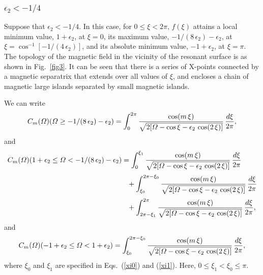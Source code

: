 \documentclass[12pt,prb,aps]{revtex4-1}
\begin{document}
\subsubsection{$\epsilon_2<-1/4$}
Suppose that $\epsilon_2<- 1/4$. In this case, for $0\leq \xi< 2\pi$, $f(\xi)$ attains a local minimum value, $1+\epsilon_2$, at $\xi=0$, its  maximum value, $-1/(8\,\epsilon_2)-\epsilon_2$, at $\xi=\cos^{-1}[-1/(4\,\epsilon_2)]$,
and its absolute minimum value, $-1+\epsilon_2$, at $\xi=\pi$.    The topology of the magnetic field 
in the vicinity of the resonant surface is as shown in Fig.~\ref{fig3}. It can be seen that there is  a series of X-points connected by a
magnetic separatrix that extends over all values of $\xi$, and encloses a chain of magnetic large islands separated by small
magnetic islands. 

We can write 
\begin{equation}
C_m({\mit\Omega})({\mit\Omega}\geq -1/(8\,\epsilon_2)-\epsilon_2) = \int_0^{2\pi}
\frac{\cos(m\,\xi)}{\sqrt{2[{\mit\Omega}-\cos\xi-\epsilon_2\,\cos(2\,\xi)]}}\,\frac{d\xi}{2\pi},
\end{equation} 
and
\begin{align}
C_m({\mit\Omega})(1+\epsilon_2\leq {\mit\Omega}< -1/(8\,\epsilon_2)-\epsilon_2) &= \int_{0}^{\xi_1}
\frac{\cos(m\,\xi)}{\sqrt{2[{\mit\Omega}-\cos\xi-\epsilon_2\,\cos(2\,\xi)]}}\,\frac{d\xi}{2\pi}\nonumber\\[0.5ex]
&\phantom{=}+\int_{\xi_0}^{2\pi-\xi_0}
\frac{\cos(m\,\xi)}{\sqrt{2[{\mit\Omega}-\cos\xi-\epsilon_2\,\cos(2\,\xi)]}}\,\frac{d\xi}{2\pi}\nonumber\\[0.5ex]
&\phantom{=}+\int_{2\pi-\xi_1}^{2\pi}
\frac{\cos(m\,\xi)}{\sqrt{2[{\mit\Omega}-\cos\xi-\epsilon_2\,\cos(2\,\xi)]}}\,\frac{d\xi}{2\pi},
\end{align} 
and
\begin{align}
C_m({\mit\Omega})(-1+\epsilon_2 \leq {\mit\Omega}< 1+\epsilon_2) = \int_{\xi_0}^{2\pi-\xi_0}
\frac{\cos(m\,\xi)}{\sqrt{2[{\mit\Omega}-\cos\xi-\epsilon_2\,\cos(2\,\xi)]}}\,\frac{d\xi}{2\pi},
\end{align} 
where $\xi_0$ and $\xi_1$ are specified in Eqs.~(\ref{xi0}) and (\ref{xi1}). 
Here, $0\leq \xi_1<\xi_0\leq \pi$. 
\end{document}
